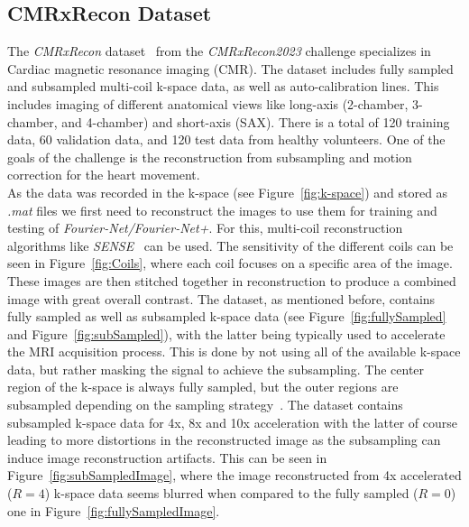 \subsection{CMRxRecon Dataset} \label{SubSec:CMRxRecon}
The \emph{CMRxRecon} dataset~\cite{CMRxRecon} from the \emph{CMRxRecon2023} challenge specializes in Cardiac magnetic resonance imaging (CMR). The dataset includes 
fully sampled and subsampled multi-coil k-space data, as well as auto-calibration lines. This includes imaging of different anatomical views like long-axis (2-chamber, 3-chamber, and 4-chamber) and short-axis (SAX). There is a total of 120 training data, 60 validation data, and 120 test data from healthy volunteers. One of the goals of the challenge is the reconstruction from subsampling and motion correction for the heart movement.\\
As the data was recorded in the k-space (see Figure~\ref{fig:k-space}) and stored as \emph{.mat} files we first need to reconstruct the images to use them for training and testing of \emph{Fourier-Net/Fourier-Net+}. For this, multi-coil reconstruction algorithms like \emph{SENSE}~\cite{SENSE1} can be used. The sensitivity of the different coils can be seen in Figure~\ref{fig:Coils}, where each coil focuses on a specific area of the image. These images are then stitched together in reconstruction to produce a combined image with great overall contrast.
The dataset, as mentioned before, contains fully sampled as well as subsampled k-space data (see Figure~\ref{fig:fullySampled} and Figure~\ref{fig:subSampled}), with the latter being typically used to accelerate the MRI acquisition process. This is done by not using all of the available k-space data, but rather masking the signal to achieve the subsampling. The center region of the k-space is always fully sampled, but the outer regions are subsampled depending on the sampling strategy~\cite{SamplingStrategies}. The dataset contains subsampled k-space data for 4x, 8x and 10x acceleration with the latter of course leading to more distortions in the reconstructed image as the subsampling can induce image reconstruction artifacts. This can be seen in Figure~\ref{fig:subSampledImage}, where the image reconstructed from 4x accelerated ($R=4$) k-space data seems blurred when compared to the fully sampled ($R=0$) one in Figure~\ref{fig:fullySampledImage}. 
